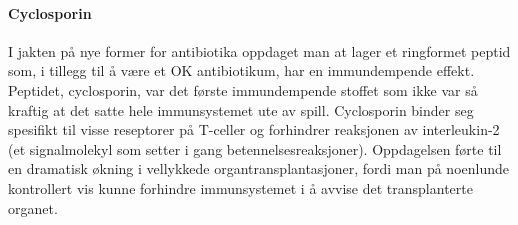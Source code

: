 \paragraph{Cyclosporin} I jakten på nye former for antibiotika oppdaget man at  lager et ringformet peptid som, i tillegg til å være et OK antibiotikum, har en immundempende effekt. Peptidet, cyclosporin, var det første immundempende stoffet som ikke var så kraftig at det satte hele immunsystemet ute av spill. Cyclosporin binder seg spesifikt til visse reseptorer på T-celler og forhindrer reaksjonen av interleukin-2 (et signalmolekyl som setter i gang betennelsesreaksjoner). Oppdagelsen førte til en dramatisk økning i vellykkede organtransplantasjoner, fordi man på noenlunde kontrollert vis kunne forhindre immunsystemet i å avvise det transplanterte organet.
